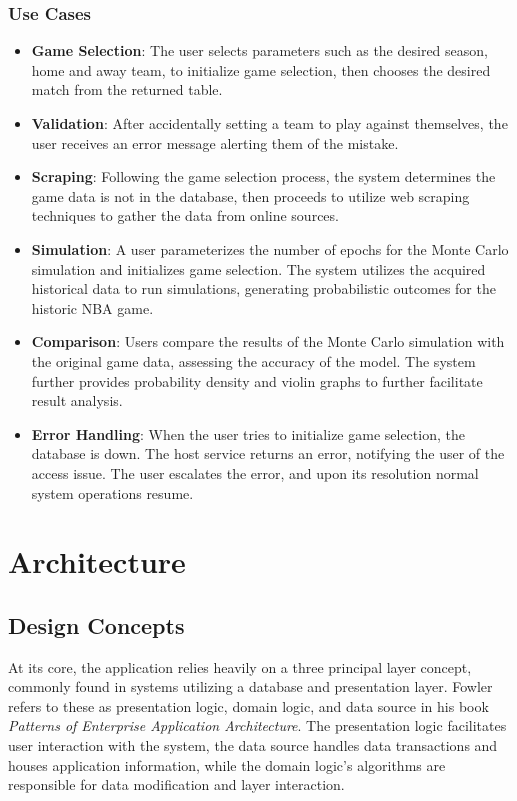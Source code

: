 \documentclass{thesis-ekf}
\theoremstyle{definition}
\theoremstyle{remark}
\begin{document}
\subsection{Use Cases}
\begin{itemize}
	\item \textbf{Game Selection}: The user selects parameters such as the desired season, home and away team, to initialize game selection, then chooses the desired match from the returned table. 
	\item \textbf{Validation}: After accidentally setting a team to play against themselves, the user receives an error message alerting them of the mistake.
	\item \textbf{Scraping}: Following the game selection process, the system determines the game data is not in the database, then proceeds to utilize web scraping techniques to gather the data from online sources. 
	\item \textbf{Simulation}: A user parameterizes the number of epochs for the Monte Carlo simulation and initializes game selection. The system utilizes the acquired historical data to run simulations, generating probabilistic outcomes for the historic NBA game.
	\item \textbf{Comparison}: Users compare the results of the Monte Carlo simulation with the original game data, assessing the accuracy of the model. The system further provides probability density and violin graphs to further facilitate result analysis.
	\item \textbf{Error Handling}: When the user tries to initialize game selection, the database is down. The host service returns an error, notifying the user of the access issue. The user escalates the error, and upon its resolution normal system operations resume.
\end{itemize}



\chapter{Architecture} \label{ch-architecture}
\section{Design Concepts}
At its core, the application relies heavily on a three principal layer \cite[p.~19]{Fowler} concept, commonly found in systems utilizing a database and presentation layer. Fowler refers to these as presentation logic, domain logic, and data source in his book \emph{Patterns of Enterprise Application Architecture}. The presentation logic facilitates user interaction with the system, the data source handles data transactions and houses application information, while the domain logic's algorithms are responsible for data modification and layer interaction. 
\end{document}
